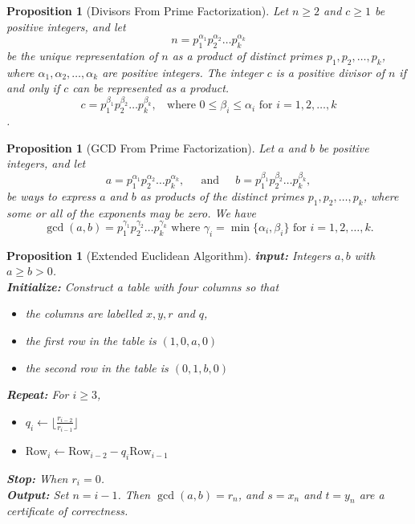 \documentclass[10pt]{article}
\theoremstyle{break}
\newtheorem{prop}[thm]{Proposition}
\begin{document}
\begin{prop}[Divisors From Prime Factorization]
Let $n \ge 2$ and $c \ge 1$ be positive integers, and let $$n = p_1^{\alpha_1}p_2^{\alpha_2} \dots p_k^{\alpha_k}$$
be the unique representation of $n$ as a product of distinct primes $p_1, p_2, \dots, p_k$, where $\alpha_1, \alpha_2, \dots, \alpha_k$ are positive integers. The integer $c$ is a positive divisor of $n$ if and only if $c$ can be represented as a product. $$c = p_1^{\beta_1}p_2^{\beta_2} \dots p_k^{\beta_k}, \; \; \text{ where } 0 \le \beta_i \le \alpha_i \text{ for } i = 1, 2, \dots, k$$.
\end{prop}

\begin{prop}[GCD From Prime Factorization]
Let $a$ and $b$ be positive integers, and let
$$a = p_1^{\alpha_1}p_2^{\alpha_2} \dots p_k^{\alpha_k}, \; \; \; \; \text{ and } \; \; \; \; b = p_1^{\beta_1}p_2^{\beta_2} \dots p_k^{\beta_k}, $$
be ways to express $a$ and $b$ as products of the distinct primes $p_1, p_2, \dots, p_k$, where some or all of the exponents may be zero. We have
$$\gcd(a,b) = p_1^{\gamma_1}p_2^{\gamma_2}\dots p_k^{\gamma_k} \text{ where } \gamma_i = \min\{\alpha_i, \beta_i\} \text{ for } i = 1,2, \dots, k.$$
\end{prop}

\begin{prop}[Extended Euclidean Algorithm]
\textbf{input:} Integers $a, b$ with $a \ge b > 0$.\\
\textbf{Initialize:} Construct a table with four columns so that
\begin{itemize}
    \item the columns are labelled $x, y, r$ and $q$,
    \item the first row in the table is $(1, 0, a, 0)$
    \item the second row in the table is $(0,1,b,0)$
\end{itemize}
\textbf{Repeat:} For $i \ge 3$, 
\begin{itemize}
    \item $q_i \leftarrow \big \lfloor \frac{r_{i-2}}{r_{i-1}} \big \rfloor$
    \item $\text{Row}_i \leftarrow \text{Row}_{i-2} - q_i \text{Row}_{i-1}$
\end{itemize}
\textbf{Stop:} When $r_i = 0$.\\
\textbf{Output:} Set $n = i-1$. Then $\gcd(a,b) = r_n$, and $s = x_n$ and $t = y_n$ are a certificate of correctness.
\end{prop}
\end{document}

